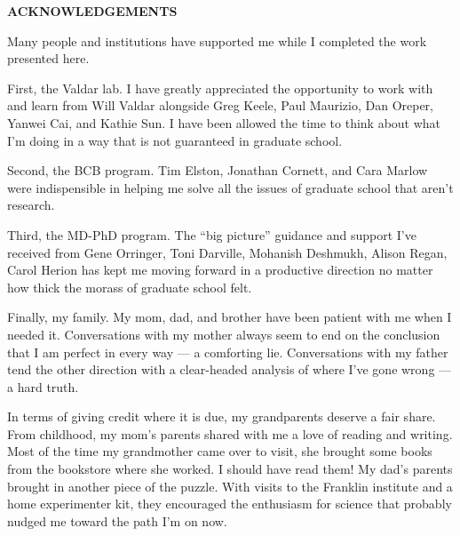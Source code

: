 
\begin{center}
\vspace*{52pt}
{\Large \textbf{ACKNOWLEDGEMENTS}}
\end{center}

Many people and institutions have supported me while I completed the work presented here.

First, the Valdar lab.
I have greatly appreciated the opportunity to work with and learn from Will Valdar alongside Greg Keele, Paul Maurizio, Dan Oreper, Yanwei Cai, and Kathie Sun.
I have been allowed the time to think about what I'm doing in a way that is not guaranteed in graduate school.

Second, the BCB program.
Tim Elston, Jonathan Cornett, and Cara Marlow were indispensible in helping me solve all the issues of graduate school that aren't research.

Third, the MD-PhD program.
The ``big picture'' guidance and support I've received from Gene Orringer, Toni Darville, Mohanish Deshmukh, Alison Regan, Carol Herion has kept me moving forward in a productive direction no matter how thick the morass of graduate school felt.

Finally, my family.
My mom, dad, and brother have been patient with me when I needed it.
Conversations with my mother always seem to end on the conclusion that I am perfect in every way --- a comforting lie.
Conversations with my father tend the other direction with a clear-headed analysis of where I've gone wrong --- a hard truth.

In terms of giving credit where it is due, my grandparents deserve a fair share.
From childhood, my mom's parents shared with me a love of reading and writing.
Most of the time my grandmother came over to visit, she brought some books from the bookstore where she worked.
I should have read them!
My dad's parents brought in another piece of the puzzle.
With visits to the Franklin institute and a home experimenter kit, they encouraged the enthusiasm for science that probably nudged me toward the path I'm on now.

\clearpage
